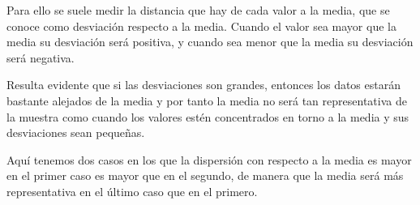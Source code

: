 \begin{frame}
{Para ello se suele medir la distancia que hay de cada valor a la media, que se conoce como desviación respecto a la media. Cuando el valor
sea mayor que la media su desviación será positiva, y cuando sea menor que la media su desviación será negativa. 

Resulta evidente que si las desviaciones son grandes, entonces los datos estarán bastante alejados de la media y por tanto la media no será
tan representativa de la muestra como cuando los valores estén concentrados en torno a la media y sus desviaciones sean pequeñas.

Aquí tenemos dos casos en los que la dispersión con respecto a la media es mayor en el primer caso es mayor que en el segundo, de manera que
la media será más representativa en el último caso que en el primero.}
\end{frame}


